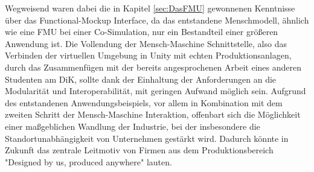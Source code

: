 \newline
Wegweisend waren dabei die in Kapitel \ref{sec:DasFMU} gewonnenen Kenntnisse über das Functional-Mockup Interface, da das entstandene Menschmodell, ähnlich wie eine FMU bei einer Co-Simulation, nur ein Bestandteil einer größeren Anwendung ist. Die Vollendung der Mensch-Maschine Schnittstelle, also das Verbinden der virtuellen Umgebung in Unity mit echten Produktionsanlagen, durch das Zusammenfügen mit der bereits angesprochenen Arbeit eines anderen Studenten am DiK, sollte dank der Einhaltung der Anforderungen an die Modularität und Interoperabilität, mit geringen Aufwand möglich sein.
\newline\newline
Aufgrund des entstandenen Anwendungsbeispiels, vor allem in Kombination mit dem zweiten Schritt der Mensch-Maschine Interaktion, offenbart sich die Möglichkeit einer maßgeblichen Wandlung der Industrie, bei der insbesondere die Standortunabhängigkeit von Unternehmen gestärkt wird. Dadurch könnte in Zukunft das zentrale Leitmotiv von Firmen aus dem Produktionsbereich "Designed by us, produced anywhere" \cite{34} lauten.
